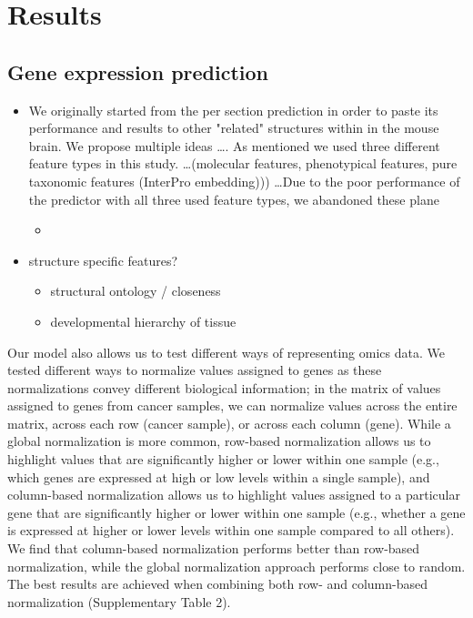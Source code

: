 \documentclass[]{article}
\begin{document}
\newpage
\section{Results}
\label{sec:results}
\subsection{Gene expression prediction}

\begin{itemize}
	\item We originally started from the per section prediction in order to paste its performance and results to other "related" structures within in the mouse brain. We propose multiple ideas \dots. As mentioned we used three different feature types in this study. \dots (molecular features, phenotypical features, pure taxonomic features (InterPro embedding))) \dots Due to the poor performance of the predictor with all three used feature types, we abandoned these plane
	\begin{itemize}
		\item 
	\end{itemize}
	\item structure specific features?
	\begin{itemize}
		\item structural ontology / closeness
		\item developmental hierarchy of tissue
	\end{itemize}
\end{itemize}

Our model also allows us to test different ways of representing omics data. We
tested different ways to normalize values assigned to genes as these normalizations
convey different biological information; in the matrix of values assigned to genes from
cancer samples, we can normalize values across the entire matrix, across each row
(cancer sample), or across each column (gene). While a global normalization is more
common, row-based normalization allows us to highlight values that are significantly
higher or lower within one sample (e.g., which genes are expressed at high or low levels within a single sample), and column-based normalization allows us to highlight values
assigned to a particular gene that are significantly higher or lower within one sample
(e.g., whether a gene is expressed at higher or lower levels within one sample compared
to all others). We find that column-based normalization performs better than row-based
normalization, while the global normalization approach performs close to random. The
best results are achieved when combining both row- and column-based normalization
(Supplementary Table 2).	
\end{document}
